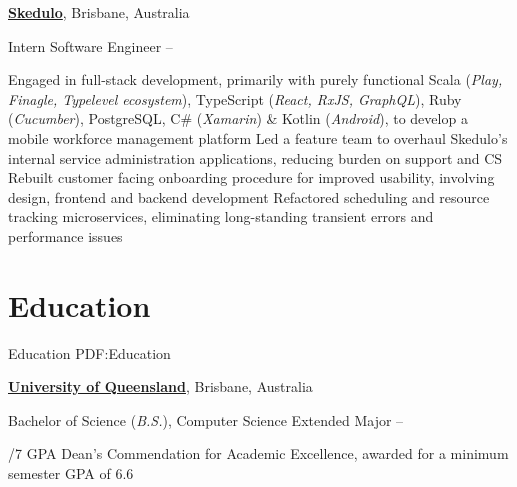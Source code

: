 \documentclass[a4paper,10pt,oneside]{article}
\begin{document}
\begin{minipage}[t][0pt]{\linewidth}
\begin{body}
\href{https://skedulo.com/}{\textbf{Skedulo}}, Brisbane, Australia
\par Intern Software Engineer\hfill {} --  
\begin{detail}
	\BulletItem Engaged in full-stack development, primarily with purely functional Scala (\textit{Play, Finagle, Typelevel ecosystem}),\newline
	TypeScript (\textit{React, RxJS, GraphQL}), Ruby (\textit{Cucumber}), PostgreSQL, C\# (\textit{Xamarin}) \& Kotlin (\textit{Android}), to develop a mobile workforce management platform 
	\BulletItem Led a feature team to overhaul Skedulo's internal service administration applications, reducing burden on support and CS
	\BulletItem Rebuilt customer facing onboarding procedure for improved usability, involving design, frontend and backend development
	\BulletItem Refactored scheduling and resource tracking microservices, eliminating long-standing transient errors and performance issues
\end{detail}


\section
{Education}
{Education}
{PDF:Education}

\href{https://www.uq.edu.au/}{\textbf{University of Queensland}}, Brisbane, Australia
\par Bachelor of Science (\textit{B.S.}), Computer Science Extended Major \hfill {} -- 
\begin{detail}
/7 GPA
\BulletItem Dean's Commendation for Academic Excellence, awarded for a minimum semester GPA of 6.6 \hfill {}
\end{detail}




\end{body}
\end{minipage}
\end{document}
